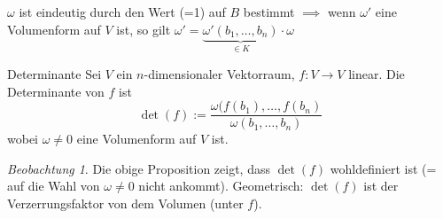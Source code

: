 \documentclass[11pt]{article}
\theoremstyle{remark}
\newtheorem{beobachtung}{Beobachtung}
\theoremstyle{definition}
\theoremstyle{remark}
\begin{document}
\(\omega\) ist eindeutig durch den Wert (=1) auf \(B\) bestimmt \(\implies\)  wenn \(\omega'\) eine Volumenform auf \(V\) ist, so gilt \(\omega' = \underbrace{\omega'(b_1,\dots,b_n)}_{\in K}\cdot\omega\)

\begin{definition}{Determinante}{}
	Sei \(V\) ein \(n\)-dimensionaler Vektorraum, \(f: V\to V\) linear. Die Determinante von \(f\) ist
	\[\det(f):= \frac{\omega(f(b_1),\dots,f(b_n)}{\omega(b_1,\dots,b_n)}\]
	wobei \(\omega \neq 0\) eine Volumenform auf \(V\) ist.
\end{definition}

\begin{beobachtung}
	Die obige Proposition zeigt, dass \(\det(f)\) wohldefiniert ist (= auf die Wahl von \(\omega\neq 0\) nicht ankommt). Geometrisch: \(\det(f)\) ist der Verzerrungsfaktor von dem Volumen (unter \(f\)).
\end{beobachtung}
\end{document}
